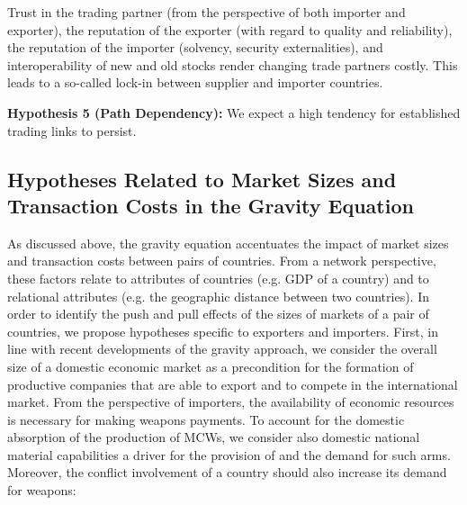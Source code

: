 \documentclass[12pt, letterpaper]{article}
\numberwithin{equation}{section}
\begin{document}
Trust in the trading partner (from the perspective of both importer and exporter), the reputation of the exporter (with regard to quality and reliability), the reputation of the importer (solvency, security externalities), and interoperability of new and old stocks render changing trade partners costly. This leads to a so-called lock-in between supplier and importer countries.
\vspace{-0.5cm}
\begin{itemize}
\begin{singlespace}
\item[] \textbf{Hypothesis 5 (Path Dependency):} 
We expect a high tendency for established trading links to persist.
\end{singlespace}
\end{itemize}  




\subsection{Hypotheses Related to Market Sizes and Transaction Costs in the Gravity Equation}

As discussed above, the gravity equation accentuates the impact of market sizes and transaction costs between pairs of countries. From a network perspective, these factors relate to attributes of countries (e.g. GDP of a country) and to relational attributes (e.g. the geographic distance between two countries). In order to identify the push and pull effects of the sizes of markets of a pair of countries, we propose hypotheses specific to exporters and importers. First, in line with recent developments of the gravity approach, we consider the overall size of a domestic economic market as a precondition for the formation of productive companies that are able to export and to compete in the international market. From the perspective of importers, the availability of economic resources is necessary for making weapons payments. To account for the domestic absorption of the production of MCWs, we consider also domestic national material capabilities \citep{Singer1972} a driver for the provision of and the demand for such arms. Moreover, the conflict involvement of a country should also increase its demand for weapons: 
\end{document}
